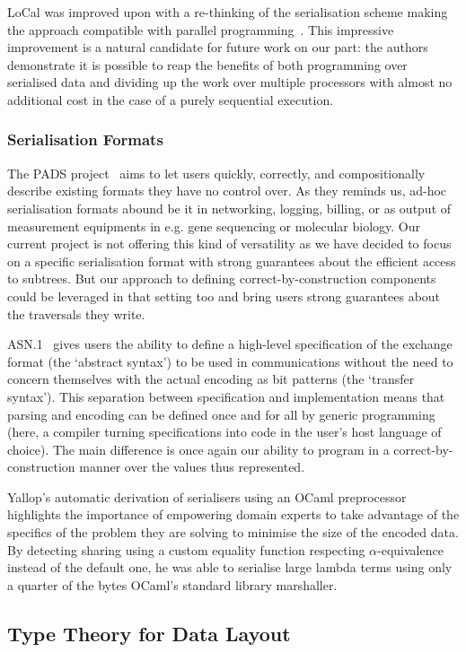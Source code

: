 LoCal was improved upon with a re-thinking of the serialisation scheme
making the approach compatible with parallel
programming~\citep{DBLP:journals/pacmpl/KoparkarRVKN21}.
This impressive improvement is a natural candidate for future work on our
part: the authors demonstrate it is possible to reap the benefits of
both programming over serialised data
and dividing up the work over multiple processors
with almost no additional cost in the case of a purely sequential execution.

\subsubsection{Serialisation Formats}

The PADS project~\citep{DBLP:conf/popl/MandelbaumFWFG07} aims to let users
quickly, correctly, and compositionally describe existing formats they
have no control over.
%
As they reminds us, ad-hoc serialisation formats abound be it in
networking, logging, billing, or as output of measurement equipments
in e.g. gene sequencing or molecular biology.
%
Our current project is not offering this kind of versatility as we have
decided to focus on a specific serialisation format with strong
guarantees about the efficient access to subtrees.
%
But our approach to defining correct-by-construction components could
be leveraged in that setting too and bring users strong guarantees about
the traversals they write.

ASN.1~\citep{MANUAL:book/larmouth1999} gives users the ability to define
a high-level specification of the exchange format (the `abstract syntax')
to be used in communications without the need to concern themselves with
the actual encoding as bit patterns (the `transfer syntax').
%
This separation between specification and implementation means that parsing
and encoding can be defined once and for all by generic programming
(here, a compiler turning specifications into code in the user's host
language of choice).
%
The main difference is once again our ability to program in a
correct-by-construction manner over the values thus represented.


Yallop's automatic derivation of serialisers using an OCaml
preprocessor~\citep{DBLP:conf/ml/Yallop07} highlights the importance
of empowering domain experts to take advantage of the specifics of
the problem they are solving to minimise the size of the encoded data.
%
By detecting sharing using a custom equality function respecting
$\alpha$-equivalence instead of the default one, he was able to
serialise large lambda terms using only
a quarter of the bytes OCaml's standard library marshaller.

\subsection{Type Theory for Data Layout}



\citep{DBLP:conf/popl/PetersenHCP03}
